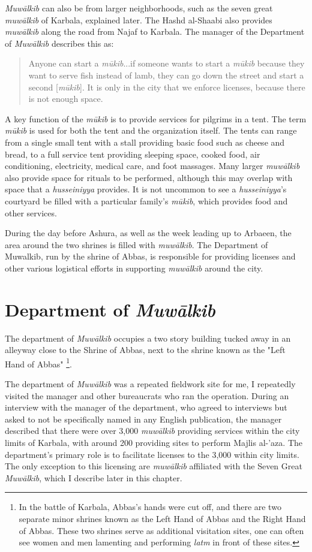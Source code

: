 \emph{Muwālkib} can also be from larger neighborhoods, such as the seven great \emph{muwālkib} of Karbala, explained later. The Hashd al-Shaabi also provides \emph{muwālkib} along the road from Najaf to Karbala. The manager of the Department of \emph{Muwālkib} describes this as:

\begin{quote}
    Anyone can start a \emph{mūkib}...if someone wants to start a \emph{mūkib} because they want to serve fish instead of lamb, they can go down the street and start a second [\emph{mūkib}]. It is only in the city that we enforce licenses, because there is not enough space.
\end{quote}

A key function of the \emph{mūkib} is to provide services for pilgrims in a tent. The term \emph{mūkib} is used for both the tent and the organization itself. The tents can range from a single small tent with a stall providing basic food such as cheese and bread, to a full service tent providing sleeping space, cooked food, air conditioning, electricity, medical care, and foot massages. Many larger \emph{muwālkib} also provide space for rituals to be performed, although this may overlap with space that a \emph{husseiniyya} provides. It is not uncommon to see a \emph{husseiniyya}'s courtyard be filled with a particular family's \emph{mūkib}, which provides food and other services. 

During the day before Ashura, as well as the week leading up to Arbaeen, the area around the two shrines is filled with \emph{muwālkib}. The Department of Muwalkib, run by the shrine of Abbas, is responsible for providing licenses and other various logistical efforts in supporting \emph{muwālkib} around the city.

\section{Department of \emph{Muwālkib}}
The department of \emph{Muwālkib} occupies a two story building tucked away in an alleyway close to the Shrine of Abbas, next to the shrine known as the "Left Hand of Abbas" \footnote{In the battle of Karbala, Abbas's hands were cut off, and there are two separate minor shrines known as the Left Hand of Abbas and the Right Hand of Abbas. These two shrines serve as additional visitation sites, one can often see women and men lamenting and performing \emph{latm} in front of these sites.}. 

The department of \emph{Muwālkib} was a repeated fieldwork site for me, I repeatedly visited the manager and other bureaucrats who ran the operation. During an interview with the manager of the department, who agreed to interviews but asked to not be specifically named in any English publication, the manager described that there were over 3,000 \emph{muwālkib} providing services within the city limits of Karbala, with around 200 providing sites to perform Majlis al-'aza. The department's primary role is to facilitate licenses to the 3,000 within city limits. The only exception to this licensing are \emph{muwālkib} affiliated with the Seven Great \emph{Muwālkib}, which I describe later in this chapter. 

